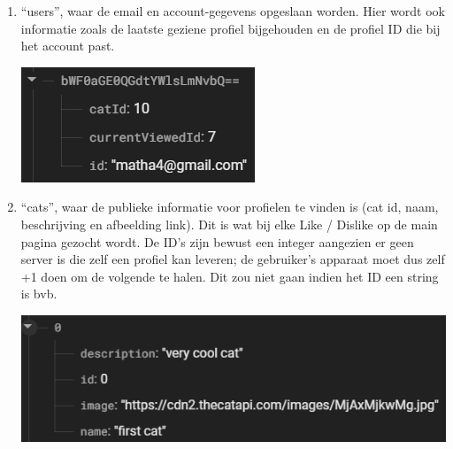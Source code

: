 \documentclass{report}
\begin{document}
\begin{enumerate}
    \item ``users'', waar de email en account-gegevens opgeslaan worden.
    Hier wordt ook informatie zoals de laatste geziene profiel bijgehouden en de profiel ID die bij het account past.
    \begin{center}
        \includegraphics{DB_user}
    \end{center}

    \item ``cats'', waar de publieke informatie voor profielen te vinden is (cat id, naam, beschrijving en afbeelding link).
    Dit is wat bij elke Like / Dislike op de main pagina gezocht wordt.
    De ID's zijn bewust een integer aangezien er geen server is die zelf een profiel kan leveren; de gebruiker's apparaat moet dus zelf +1 doen om de volgende te halen.
    Dit zou niet gaan indien het ID een string is bvb.
    \begin{center}
        \includegraphics{DB_cat}
    \end{center}
    

\end{enumerate}
\end{document}
